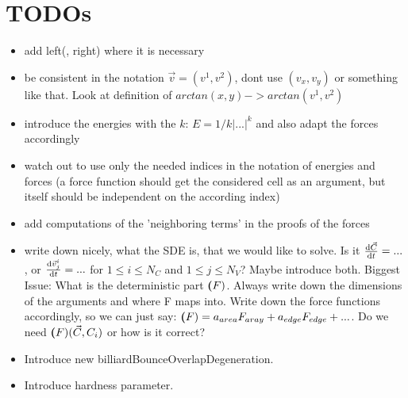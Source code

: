 \section{TODOs}

\begin{itemize}
    \item add left(, right) where it is necessary 
    \item be consistent in the notation $\vec{v} = (v^1, v^2)$, dont use $(v_x, v_y)$ or something like that. Look at definition of $arctan(x,y) -> arctan(v^1,v^2)$
    \item introduce the energies with the $k$: $E = 1/k |...|^k$ and also adapt the forces accordingly 
    \item watch out to use only the needed indices in the notation of energies and forces (a force function should get the considered cell as an argument, but itself should be independent on the according index)
    \item add computations of the 'neighboring terms' in the proofs of the forces  
    \item write down nicely, what the SDE is, that we would like to solve. Is it $\frac{\mathrm{d} \vec{C}}{\mathrm{d} t} = ... $, or $\frac{\mathrm{d} \vec{v}_j^i}{\mathrm{d} t} = ... $ for $ 1 \leq i \leq N_C$ and $1 \leq j \leq N_V$? Maybe introduce both. Biggest Issue: What is the deterministic part $\textbf(F)$. Always write down the dimensions of the arguments and where F maps into. Write down the force functions accordingly, so we can just say: $\textbf(F) = a_{area} F_{aray} + a_{edge} F_{edge} + ...$. Do we need $\textbf(F)(\vec{C}, C_i)$ or how is it correct?
    \item Introduce new billiardBounceOverlapDegeneration.
    \item Introduce hardness parameter. 
\end{itemize}
